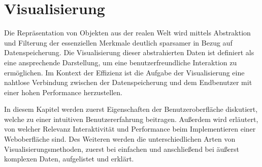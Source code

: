 \chapter{Visualisierung}
\label{chp:visualization}

Die Repräsentation von Objekten aus der realen Welt wird mittels Abstraktion und Filterung der essenziellen Merkmale deutlich sparsamer in Bezug auf Datenspeicherung. Die Visualisierung dieser abstrahierten Daten ist definiert als eine ansprechende Darstellung, um eine benutzerfreundliche Interaktion zu ermöglichen. Im Kontext der Effizienz ist die Aufgabe der Visualisierung eine nahtlose Verbindung zwischen der Datenspeicherung und dem Endbenutzer mit einer hohen Performance herzustellen. \cite{modellierung2005glinz,pfefferer1996objektzentrierte}

In diesem Kapitel werden zuerst Eigenschaften der Benutzeroberfläche diskutiert, welche zu einer intuitiven Benutzererfahrung beitragen. Außerdem wird erläutert, von welcher Relevanz Interaktivität und Performance beim Implementieren einer Weboberfläche sind. Des Weiteren werden die unterschiedlichen Arten von Visualisierungsmethoden, zuerst bei einfachen und anschließend bei äußerst komplexen Daten, aufgelistet und erklärt.



